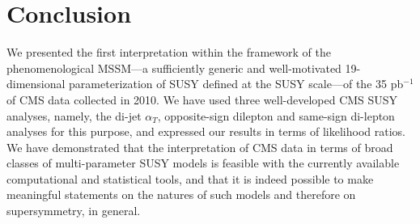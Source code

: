 \section{Conclusion}
\label{sec:conclusion}

We presented the first interpretation within the framework of the phenomenological MSSM---a sufficiently generic and well-motivated 19-dimensional parameterization of SUSY defined at the SUSY scale---of the 35 pb$^{-1}$ of CMS data collected in 2010.  We have used three well-developed CMS SUSY analyses, namely, the di-jet $\alpha_T$, opposite-sign dilepton and same-sign di-lepton analyses for this purpose, and expressed our results in terms of likelihood ratios.  We have demonstrated that the interpretation of CMS data in terms of broad classes of multi-parameter SUSY models is feasible with the currently available computational and statistical tools, and that it is indeed possible to make meaningful statements on the natures of such models and therefore on supersymmetry, in general.

